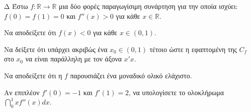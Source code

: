 \begin{thema}{Δ}
Έστω $f: \mathbb{R} \to \mathbb{R}$ μια δύο φορές παραγωγίσιμη συνάρτηση για την οποία ισχύει: $f(0)=f(1)=0$ και $f''(x) > 0$ για κάθε $x \in \mathbb{R}$.
\begin{erwthma}
    \item Να αποδείξετε ότι $f(x) < 0$ για κάθε $x \in (0, 1)$.
    \item Να δείξετε ότι υπάρχει ακριβώς ένα $x_0 \in (0, 1)$ τέτοιο ώστε η εφαπτομένη της $C_f$ στο $x_0$ να είναι παράλληλη με τον άξονα $x'x$.
    \item Να αποδείξετε ότι η $f$ παρουσιάζει ένα μοναδικό ολικό ελάχιστο.
    \item Αν επιπλέον $f'(0)=-1$ και $f'(1)=2$, να υπολογίσετε το ολοκλήρωμα $\dint_0^1 x f''(x) dx$.
\end{erwthma}
\end{thema}
